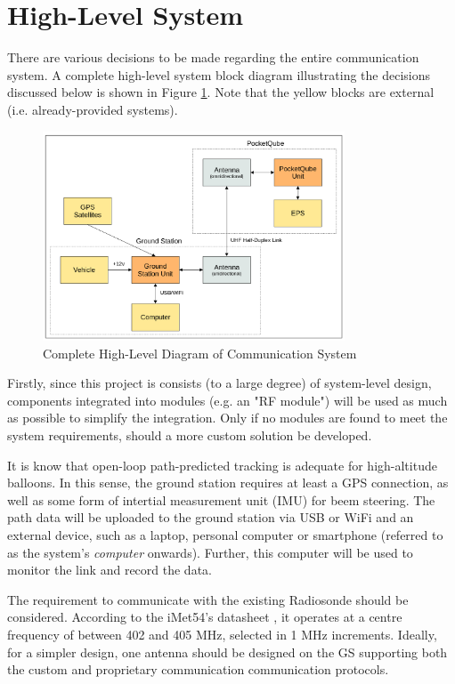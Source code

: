 \graphicspath{{./figures}}

\section{High-Level System}
There are various decisions to be made regarding the entire communication system. A complete high-level system block diagram illustrating the decisions discussed below is shown in Figure \ref{fig:complete_system}. Note that the yellow blocks are external (i.e. already-provided systems).

\begin{figure}[!htb]
    \centering
    \includegraphics[width=0.8\textwidth]{complete_system.png}
    \caption{Complete High-Level Diagram of Communication System}
    \label{fig:complete_system}
  \end{figure}

\newpage
Firstly, since this project is consists (to a large degree) of system-level design, components integrated into modules (e.g. an "RF module") will be used as much as possible to simplify the integration. Only if no modules are found to meet the system requirements, should a more custom solution be developed.

It is know that open-loop path-predicted tracking is adequate for high-altitude balloons. In this sense, the ground station requires at least a GPS connection, as well as some form of intertial measurement unit (IMU) for beem steering. The path data will be uploaded to the ground station via USB or WiFi and an external device, such as a laptop, personal computer or smartphone (referred to as the system's \textit{computer} onwards). Further, this computer will be used to monitor the link and record the data.

The requirement to communicate with the existing Radiosonde should be considered. According to the iMet54's datasheet \cite{datasheet-iMet54}, it operates at a centre frequency of between 402 and 405 MHz, selected in 1 MHz increments. Ideally, for a simpler design, one antenna should be designed on the GS supporting both the custom and proprietary communication communication protocols.


